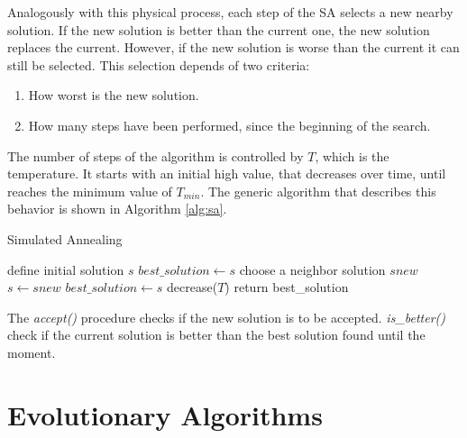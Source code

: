 			Analogously with this physical process, each step of the SA selects a new nearby solution. If the new solution is better than the current one, the new solution replaces the current. However, if the new solution is worse than the current it can still be selected. This selection depends of two criteria:
			\begin{enumerate}
				\item How worst is the new solution.
				\item How many steps have been performed, since the beginning of the search.
			\end{enumerate}
			The number of steps of the algorithm is controlled by $T$, which is the temperature. It starts with an initial high value, that decreases over time, until reaches the minimum value of $T_{min}$. The generic algorithm that describes this behavior is shown in Algorithm \ref{alg:sa}.
			
			
			\begin{algorithm}
				\caption{Simulated Annealing}
				\label{alg:sa}
				\begin{algorithmic}
				\STATE define initial solution $s$
				\STATE $best\_solution \gets s$ 
					\STATE choose a neighbor solution $snew$
						\STATE  $s \gets snew$
					\ENDIF
						\STATE  $best\_solution \gets s$
					\ENDIF
					\STATE decrease($T$)
				\ENDWHILE
				\STATE return best\_solution
				\end{algorithmic}
			\end{algorithm}
		
		
		\noindent The \emph{accept()} procedure checks if the new solution is to be accepted. \emph{is\_better()} check if the current solution is better than the best solution found until the moment.

			
		\section{Evolutionary Algorithms}
			\label{subsec:evolutionary_algorithms}
			
